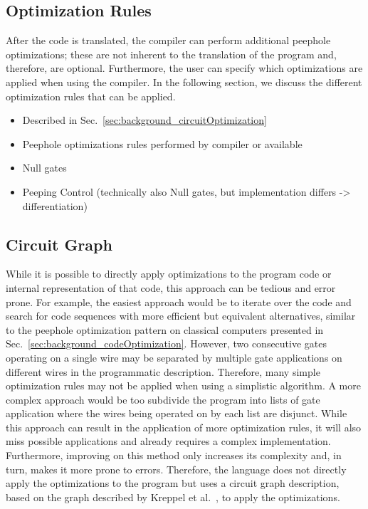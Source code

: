 \subsection{Optimization Rules}
After the code is translated, the compiler can perform additional peephole optimizations; these are not inherent to the translation of the program and, therefore, are optional. Furthermore, the user can specify which optimizations are applied when using the compiler. In the following section, we discuss the different optimization rules that can be applied. 
\begin{itemize}
    \item Described in Sec.~\ref{sec:background_circuitOptimization}
    \item Peephole optimizations rules performed by compiler or available
    \item Null gates
    \item Peeping Control (technically also Null gates, but implementation differs -> differentiation)
\end{itemize}

\subsection{Circuit Graph}
\label{sec:concept_circuitGraph}
While it is possible to directly apply optimizations to the program code or internal representation of that code, this approach can be tedious and error prone. For example, the easiest approach would be to iterate over the code and search for code sequences with more efficient but equivalent alternatives, similar to the peephole optimization pattern on classical computers presented in Sec.~\ref{sec:background_codeOptimization}. However, two consecutive gates operating on a single wire may be separated by multiple gate applications on different wires in the programmatic description. 
Therefore, many simple optimization rules may not be applied when using a simplistic algorithm. A more complex approach would be too subdivide the program into lists of gate application where the wires being operated on by each list are disjunct. While this approach can result in the application of more optimization rules, it will also miss possible applications and already requires a complex implementation. Furthermore, improving on this method only increases its complexity and, in turn, makes it more prone to errors. Therefore, the language does not directly apply the optimizations to the program but uses a circuit graph description, based on the graph described by Kreppel et al.~\cite{KMO*23}, to apply the optimizations.

